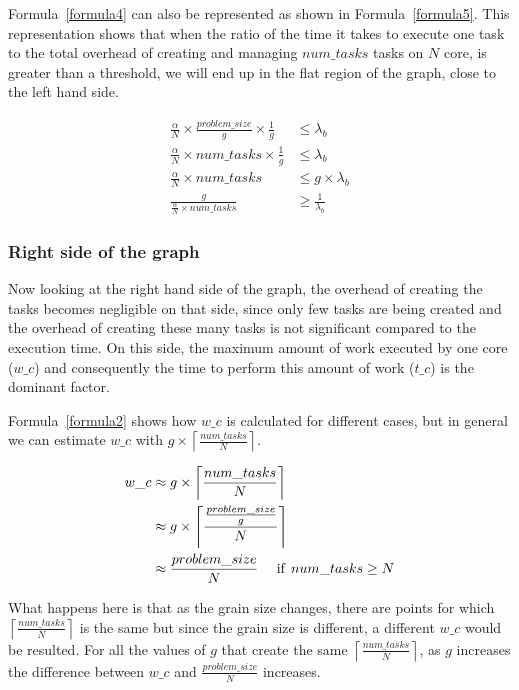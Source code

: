 Formula~\ref{formula4} can also be represented as shown in Formula~\ref{formula5}. This representation shows that when the ratio of the time it takes to execute one task to the total overhead of creating and managing $num\_{tasks}$ tasks on $N$ core, is greater than a threshold, we will end up in the flat region of the graph, close to the left hand side.


\begin{equation}\label{formula5}
\begin{aligned}
\frac{\alpha}{N}\times{\frac{problem\_{size}}{g}}\times{\frac{1}{g}}&\leq{\lambda_b}\\
\frac{\alpha}{N}\times{num\_{tasks}}\times{\frac{1}{g}}&\leq{\lambda_b}\\
\frac{\alpha}{N}\times{num\_{tasks}}&\leq{g\times\lambda_b}\\	
\frac{g}{\frac{\alpha}{N}\times{num\_{tasks}}}&\geq{\frac{1}{\lambda_b}}
\end{aligned}
\end{equation}


\subsubsection{Right side of the graph}
Now looking at the right hand side of the graph, the overhead of creating the tasks becomes negligible on that side, since only few tasks are being created and the overhead of creating these many tasks is not significant compared to the execution time. On this side, the maximum amount of work executed by one core ($w\_c$) and consequently the time to perform this amount of work ($t\_c$) is the dominant factor.

Formula~\ref{formula2} shows how $w\_c$ is calculated for different cases, but in general we can estimate $w\_c$ with $g\times\left \lceil{\frac{num\_{tasks}}{N}}\right \rceil$. 

\begin{equation}\label{formula6}
\begin{aligned}
w\_c&\approx{g\times\left \lceil{\frac{num\_{tasks}}{N}}\right \rceil}\\
&\approx{g\times\left \lceil{\frac{\frac{problem\_{size}}{g}}{N}}\right \rceil}\\
&\approx{\frac{problem\_{size}}{N}} \:\:\text{\:\:\:\:if\:\:} num\_{tasks}\geq{N}
\end{aligned}
\end{equation}

What happens here is that as the grain size changes, there are points for which $\left \lceil{\frac{num\_{tasks}}{N}}\right \rceil$ is the same but since the grain size is different, a different $w\_c$ would be resulted. 
For all the values of $g$ that create the same $\left \lceil{\frac{num\_{tasks}}{N}}\right \rceil$, as $g$ increases the difference between $w\_c$ and $\frac{problem\_{size}}{N}$ increases. 

